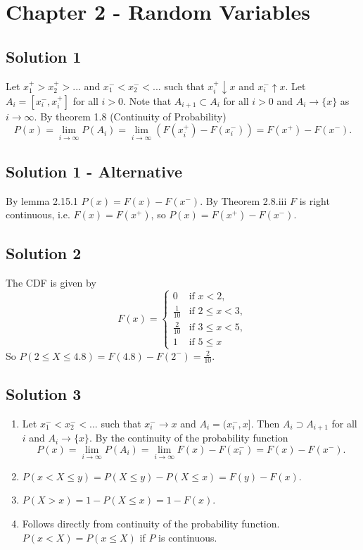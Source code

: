 \section*{Chapter 2 - Random Variables}

\subsection*{Solution 1}

Let $x^+_1 > x^+_2 > ...$ and $x^-_1 < x^-_2 < ...$ such that $x^+_i \downarrow x$ and $x^-_i \uparrow x$.
Let $A_i = [x^-_i, x^+_i]$ for all $i > 0$.
Note that $A_{i+1} \subset A_i$ for all $i > 0$ and $A_i \to \{x\}$ as $i \to \infty$.
By theorem 1.8 (Continuity of Probability)
$$
P(x) = \lim_{i \to \infty} P(A_i) = \lim_{i \to \infty} (F(x^+_i) - F(x^-_i)) = F(x^+) - F(x^-).
$$

\subsection*{Solution 1 - Alternative}

By lemma 2.15.1 $P(x) = F(x) - F(x^-)$.
By Theorem 2.8.iii $F$ is right continuous, i.e. $F(x) = F(x^+)$, so $P(x) = F(x^+) - F(x^-)$.


\subsection*{Solution 2}

The CDF is given by
$$
F(x) = \left\{ \begin{array}{ll}
    0 & \text{if } x < 2, \\
    \frac{1}{10} & \text{if } 2 \leq x < 3, \\
    \frac{2}{10} & \text{if } 3 \leq x < 5, \\
    1 & \text{if } 5 \leq x
\end{array} \right.
$$
So $P(2 \leq X \leq 4.8) = F(4.8) - F(2^-) = \frac{2}{10}$.


\subsection*{Solution 3}

\begin{enumerate}
\item Let $x^-_1 < x^-_2 < ...$ such that $x^-_i \to x$ and $A_i = (x^-_i, x]$.
Then $A_i \supset A_{i+1}$ for all $i$ and $A_i \to \{x\}$.
By the continuity of the probability function
$$
P(x) = \lim_{i \to \infty} P(A_i) = \lim_{i \to \infty} F(x) - F(x^-_i) = F(x) - F(x^-).
$$
\item $P(x < X \leq y) = P(X \leq y) - P(X \leq x) = F(y) - F(x)$.
\item $P(X > x) = 1 - P(X \leq x) = 1 - F(x)$.
\item Follows directly from continuity of the probability function.
$P(x < X) = P(x \leq X)$ if $P$ is continuous.
\end{enumerate}


